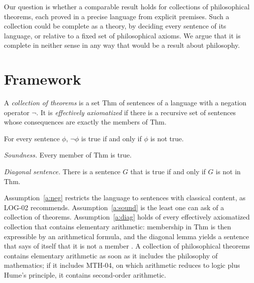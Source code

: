 \documentclass{situationist-preprint}
\begin{document}
Our question is whether a comparable result holds for collections of philosophical theorems, each proved in a precise language from explicit premises. Such a collection could be complete as a theory, by deciding every sentence of its language, or relative to a fixed set of philosophical axioms. We argue that it is complete in neither sense in any way that would be a result about philosophy.

\section{Framework}

\begin{definition}\label{d:coll}
A \emph{collection of theorems} is a set $\mathrm{Thm}$ of sentences of a language with a negation operator $\neg$. It is \emph{effectively axiomatized} if there is a recursive set of sentences whose consequences are exactly the members of $\mathrm{Thm}$.
\end{definition}

\begin{assumption}\label{a:neg}
For every sentence $\phi$, $\neg\phi$ is true if and only if $\phi$ is not true.
\end{assumption}

\begin{assumption}\label{a:sound}
\emph{Soundness.} Every member of $\mathrm{Thm}$ is true.
\end{assumption}

\begin{assumption}\label{a:diag}
\emph{Diagonal sentence.} There is a sentence $G$ that is true if and only if $G$ is not in $\mathrm{Thm}$.
\end{assumption}

Assumption~\ref{a:neg} restricts the language to sentences with classical content, as LOG-02 recommends. Assumption~\ref{a:sound} is the least one can ask of a collection of theorems. Assumption~\ref{a:diag} holds of every effectively axiomatized collection that contains elementary arithmetic: membership in $\mathrm{Thm}$ is then expressible by an arithmetical formula, and the diagonal lemma yields a sentence that says of itself that it is not a member \citep{Goedel1931,Smullyan1992}. A collection of philosophical theorems contains elementary arithmetic as soon as it includes the philosophy of mathematics; if it includes MTH-04, on which arithmetic reduces to logic plus Hume's principle, it contains second-order arithmetic.
\end{document}
